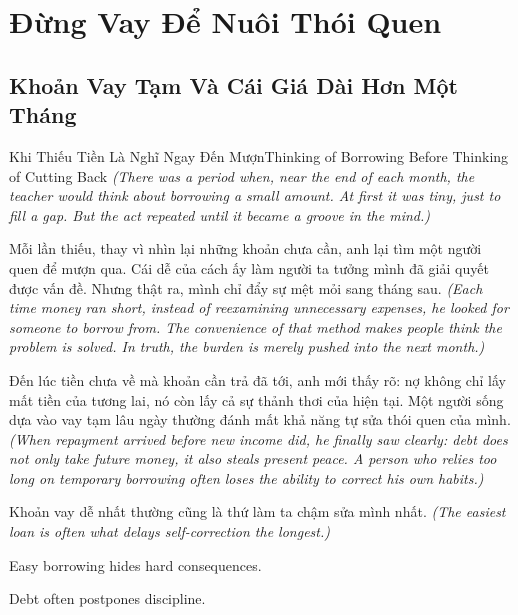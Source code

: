 \chapter{Đừng Vay Để Nuôi Thói Quen}

\section{Khoản Vay Tạm Và Cái Giá Dài Hơn Một Tháng}
\begin{truyen}{Khi Thiếu Tiền Là Nghĩ Ngay Đến Mượn}{Thinking of Borrowing Before Thinking of Cutting Back}
\textit{(There was a period when, near the end of each month, the teacher would think about borrowing a small amount. At first it was tiny, just to fill a gap. But the act repeated until it became a groove in the mind.)}

Mỗi lần thiếu, thay vì nhìn lại những khoản chưa cần, anh lại tìm một người quen để mượn qua. Cái dễ của cách ấy làm người ta tưởng mình đã giải quyết được vấn đề. Nhưng thật ra, mình chỉ đẩy sự mệt mỏi sang tháng sau.
\textit{(Each time money ran short, instead of reexamining unnecessary expenses, he looked for someone to borrow from. The convenience of that method makes people think the problem is solved. In truth, the burden is merely pushed into the next month.)}

Đến lúc tiền chưa về mà khoản cần trả đã tới, anh mới thấy rõ: nợ không chỉ lấy mất tiền của tương lai, nó còn lấy cả sự thảnh thơi của hiện tại. Một người sống dựa vào vay tạm lâu ngày thường đánh mất khả năng tự sửa thói quen của mình.
\textit{(When repayment arrived before new income did, he finally saw clearly: debt does not only take future money, it also steals present peace. A person who relies too long on temporary borrowing often loses the ability to correct his own habits.)}
\end{truyen}

\begin{baihoc}
Khoản vay dễ nhất thường cũng là thứ làm ta chậm sửa mình nhất.
\textit{(The easiest loan is often what delays self-correction the longest.)}
\end{baihoc}

\begin{ghinhoanh}
Easy borrowing hides hard consequences.

Debt often postpones discipline.
\end{ghinhoanh}

